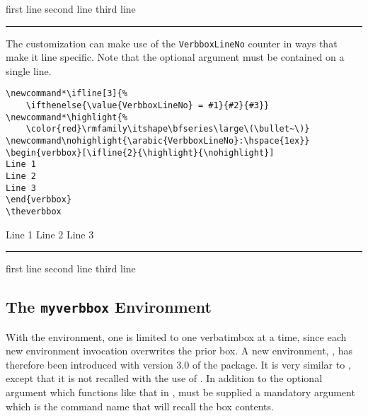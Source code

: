 \documentclass{article}
\newcommand\rl{\rule{1em}{0in}}
\begin{document}
\begin{myverbbox}{\myvb}
\begin{verbbox}
first line
second line
third line
\end{verbbox}
\rl\theverbbox

The customization can make use of the \verb|VerbboxLineNo| counter in
ways that make it line specific.  Note that the optional argument
must be contained on a single line.

\begin{verbatim}
\newcommand*\ifline[3]{%
    \ifthenelse{\value{VerbboxLineNo} = #1}{#2}{#3}}
\newcommand*\highlight{%
    \color{red}\rmfamily\itshape\bfseries\large\(\bullet~\)}
\newcommand\nohighlight{\arabic{VerbboxLineNo}:\hspace{1ex}}
\begin{verbbox}[\ifline{2}{\highlight}{\nohighlight}]
Line 1
Line 2
Line 3
\end{verbbox}
\theverbbox
\end{verbatim}

\newcommand*\ifline[3]{%
    \ifthenelse{\value{VerbboxLineNo} = #1}{#2}{#3}}
\newcommand*\highlight{%
    \color{red}\rmfamily\itshape\bfseries\large\(\bullet~\)}
\newcommand\nohighlight{\arabic{VerbboxLineNo}:\hspace{1ex}}
\begin{verbbox}[\ifline{2}{\highlight}{\nohighlight}]
Line 1
Line 2
Line 3
\end{verbbox}
\rl\theverbbox

\begin{verbbox}
first line
second line
third line
\end{verbbox}

\subsection{The \texttt{myverbbox} Environment}

With the {\vrbox} environment, one is limited to one verbatimbox at a
time, since each new environment invocation overwrites the prior box.  A
new environment, {\myvrbox}, has therefore been introduced with version
3.0 of the package.  It is very similar to \vrbox, except that it is not
recalled with the use of \tvb.  In addition to the optional argument
which functions like that in \vrbox, {\myvrbox} must be supplied a
mandatory argument which is the command name that will recall the box
contents.


\end{myverbbox}
\end{document}

